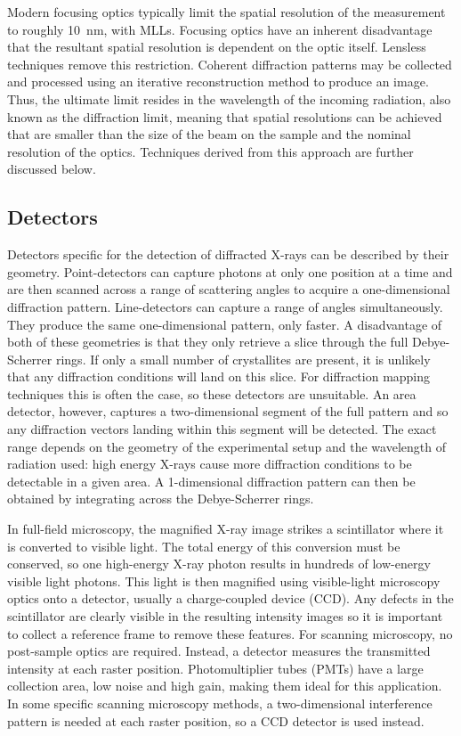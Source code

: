 \documentclass[journal=cmatex,manuscript=perspective]{achemso}
\begin{document}
Modern focusing optics typically limit the spatial resolution of the
measurement to roughly \SI{10}{nm}, with MLLs\cite{yan2014}. Focusing
optics have an inherent disadvantage that the resultant spatial
resolution is dependent on the optic itself. Lensless techniques
remove this restriction. Coherent diffraction patterns may be
collected and processed using an iterative reconstruction method to
produce an image. Thus, the ultimate limit resides in the wavelength
of the incoming radiation, also known as the diffraction limit,
meaning that spatial resolutions can be achieved that are smaller than
the size of the beam on the sample and the nominal resolution of the
optics. Techniques derived from this approach are further discussed
below.

\subsection{Detectors}

Detectors specific for the detection of diffracted X-rays can be
described by their geometry. Point-detectors can capture photons at
only one position at a time and are then scanned across a range of
scattering angles to acquire a one-dimensional diffraction
pattern. Line-detectors can capture a range of angles simultaneously. They produce the same one-dimensional pattern, only faster. A disadvantage of both of these
geometries is that they only retrieve a slice through the full
Debye-Scherrer rings. If only a small number of crystallites are
present, it is unlikely that any diffraction conditions will land on
this slice. For diffraction mapping techniques this is often the case,
so these detectors are unsuitable. An area detector, however, captures
a two-dimensional segment of the full pattern and so any diffraction
vectors landing within this segment will be detected. The exact range
depends on the geometry of the experimental setup and the wavelength
of radiation used: high energy X-rays cause more diffraction
conditions to be detectable in a given area. A 1-dimensional
diffraction pattern can then be obtained by integrating across the
Debye-Scherrer rings.

In full-field microscopy, the magnified X-ray image strikes a
scintillator where it is converted to visible light. The total energy
of this conversion must be conserved, so one high-energy X-ray photon
results in hundreds of low-energy visible light photons. This light is
then magnified using visible-light microscopy optics onto a detector,
usually a charge-coupled device (CCD). Any defects in the scintillator
are clearly visible in the resulting intensity images so it is
important to collect a reference frame to remove these features. For
scanning microscopy, no post-sample optics are required. Instead, a
detector measures the transmitted intensity at each raster
position. Photomultiplier tubes (PMTs) have a large collection area,
low noise and high gain, making them ideal for this application. In
some specific scanning microscopy methods, a two-dimensional
interference pattern is needed at each raster position, so a CCD
detector is used instead.
\end{document}

